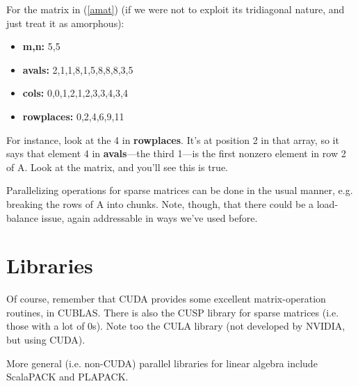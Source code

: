 For the matrix in (\ref{amat}) (if we were not to exploit its
tridiagonal nature, and just treat it as amorphous):

\begin{itemize}

\item {\bf m,n:} 5,5

\item {\bf avals:} 2,1,1,8,1,5,8,8,8,3,5

\item {\bf cols:} 0,0,1,2,1,2,3,3,4,3,4

\item {\bf rowplaces:} 0,2,4,6,9,11

\end{itemize}

For instance, look at the 4 in {\bf rowplaces}.  It's at position 2 in
that array, so it says that element 4 in {\bf avals}---the third 1---is
the first nonzero element in row 2 of A.  Look at the matrix, and you'll
see this is true.

% 

Parallelizing operations for sparse matrices can be done in the usual
manner, e.g. breaking the rows of A into chunks.  Note, though, that
there could be a load-balance issue, again addressable in ways we've
used before.

\section{Libraries}

Of course, remember that CUDA provides some excellent matrix-operation
routines, in CUBLAS.  There is also the CUSP library for sparse matrices
(i.e. those with a lot of 0s).  Note too the CULA library (not developed
by NVIDIA, but using CUDA).

More general (i.e. non-CUDA) parallel libraries for linear algebra
include ScalaPACK and PLAPACK.

